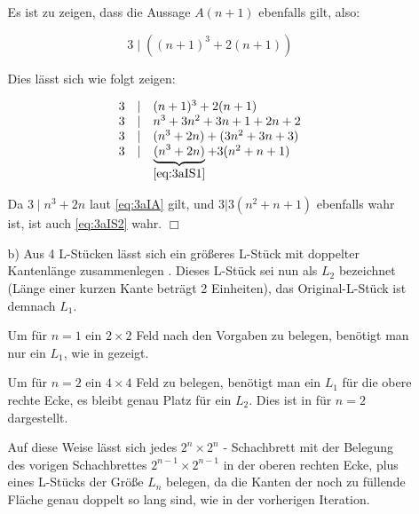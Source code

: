 \documentclass[a4paper,10pt]{scrartcl}
\begin{document}
\begin{enumerate}
\begin{enumerate}
                Es ist zu zeigen, dass die Aussage $A(n + 1)$ ebenfalls gilt, also:

                \begin{equation}\label{eq:3aIS1}
                    3 \mid \left((n+1)^3 + 2(n+1)\right)
                \end{equation}

                Dies lässt sich wie folgt zeigen:

                \begin{equation}\begin{array}{rcl}\label{eq:3aIS2}
                    3 &\mid& (n+1)^3 + 2(n+1)\\
                    3 &\mid& n^3 + 3n^2 + 3n +1 + 2n + 2\\
                    3 &\mid& (n^3 + 2n) + (3n^2  + 3n + 3)\\
                    3 &\mid& \underbrace{(n^3 + 2n)}_{\eqref{eq:3aIS1}} + 3 (n^2  + n + 1)
                \end{array}\end{equation}

                Da $3 \mid n^3 + 2n$ laut \eqref{eq:3aIA} gilt, und $3 | 3(n^2 + n + 1)$ ebenfalls
                wahr ist, ist auch \eqref{eq:3aIS2} wahr. $\Box$

            \item[b)]
                Aus 4 L-Stücken lässt sich ein größeres L-Stück mit doppelter Kantenlänge zusammenlegen .
                Dieses L-Stück sei nun als $L_2$ bezeichnet (Länge einer kurzen Kante beträgt 2 Einheiten), das
                Original-L-Stück ist demnach $L_1$.

                Um für $n = 1$ ein $2 \times 2$ Feld nach den Vorgaben zu belegen, benötigt man nur ein $L_1$,
                wie in  gezeigt.

                Um für $n = 2$ ein $4 \times 4$ Feld zu belegen, benötigt man ein $L_1$ für die obere rechte
                Ecke, es bleibt genau Platz für ein $L_2$. Dies ist in  für $n = 2$ dargestellt.

                Auf diese Weise lässt sich jedes $2^n \times 2^n$ - Schachbrett mit der Belegung des vorigen Schachbrettes
                $2^{n-1} \times 2^{n-1}$ in der oberen rechten Ecke, plus eines L-Stücks der Größe $L_n$ belegen, da die Kanten
                der noch zu füllende Fläche genau doppelt so lang sind, wie in der vorherigen Iteration.


\end{enumerate}
\end{enumerate}
\end{document}
